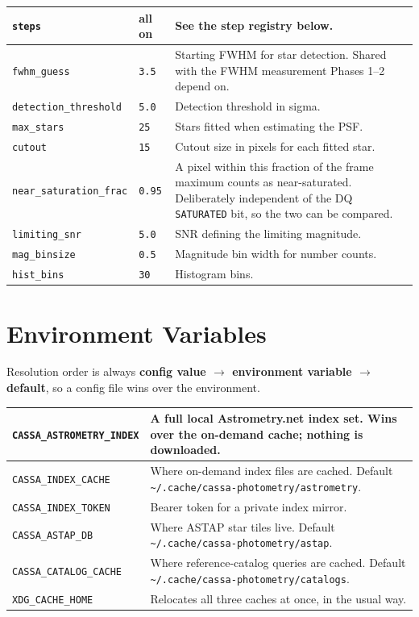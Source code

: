 \documentclass[11pt,a4paper]{article}
\begin{document}
\begin{center}
\begin{tabularx}{\textwidth}{|l|l|X|}
\hline
\texttt{steps} & all on & See the step registry below. \\
\hline
\texttt{fwhm\_guess} & \texttt{3.5} & Starting FWHM for star detection. Shared with the FWHM measurement Phases 1--2 depend on. \\
\hline
\texttt{detection\_threshold} & \texttt{5.0} & Detection threshold in sigma. \\
\hline
\texttt{max\_stars} & \texttt{25} & Stars fitted when estimating the PSF. \\
\hline
\texttt{cutout} & \texttt{15} & Cutout size in pixels for each fitted star. \\
\hline
\texttt{near\_saturation\_frac} & \texttt{0.95} & A pixel within this fraction of the frame maximum counts as near-saturated. Deliberately independent of the DQ \texttt{SATURATED} bit, so the two can be compared. \\
\hline
\texttt{limiting\_snr} & \texttt{5.0} & SNR defining the limiting magnitude. \\
\hline
\texttt{mag\_binsize} & \texttt{0.5} & Magnitude bin width for number counts. \\
\hline
\texttt{hist\_bins} & \texttt{30} & Histogram bins. \\
\hline
\end{tabularx}
\end{center}

\section{Environment Variables}
Resolution order is always \textbf{config value $\rightarrow$ environment
variable $\rightarrow$ default}, so a config file wins over the environment.

\begin{center}
\begin{tabularx}{\textwidth}{|l|X|}
\hline
\texttt{CASSA\_ASTROMETRY\_INDEX} & A full local Astrometry.net index set. Wins over the on-demand cache; nothing is downloaded. \\
\hline
\texttt{CASSA\_INDEX\_CACHE} & Where on-demand index files are cached. Default \texttt{\textasciitilde/.cache/}\allowbreak\texttt{cassa-photometry/}\allowbreak\texttt{astrometry}. \\
\hline
\texttt{CASSA\_INDEX\_TOKEN} & Bearer token for a private index mirror. \\
\hline
\texttt{CASSA\_ASTAP\_DB} & Where ASTAP star tiles live. Default \texttt{\textasciitilde/.cache/}\allowbreak\texttt{cassa-photometry/}\allowbreak\texttt{astap}. \\
\hline
\texttt{CASSA\_CATALOG\_CACHE} & Where reference-catalog queries are cached. Default \texttt{\textasciitilde/.cache/}\allowbreak\texttt{cassa-photometry/}\allowbreak\texttt{catalogs}. \\
\hline
\texttt{XDG\_CACHE\_HOME} & Relocates all three caches at once, in the usual way. \\
\hline
\end{tabularx}
\end{center}
\end{document}
